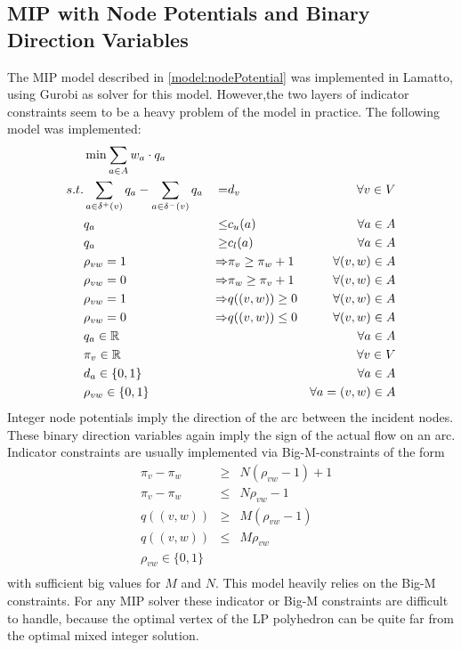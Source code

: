 \subsection{MIP with Node Potentials and Binary Direction Variables}
The MIP model described in \ref{model:nodePotential} was implemented in Lamatto, using Gurobi as solver for this 
model. However,the two layers of indicator constraints seem to be a heavy problem of the model in 
practice. The following model was implemented:
\begin{align*}
  &\min \sum_{a\in A} w_a\cdot q_a & \\
 s.t. & \sum_{a\in \delta^+(v)}q_a - \sum_{a\in\delta^- (v)}q_a &=& d_v\ &\forall v\in V \\
 & q_a &\le& c_u(a) & \forall a\in A\\
 & q_a &\ge& c_l(a) & \forall a\in A\\
 & \rho_{vw}=1 &\Rightarrow &\pi_v\ge\pi_w +1 & \forall (v,w)\in A\\
 & \rho_{vw}=0 &\Rightarrow &\pi_w\ge\pi_v +1& \forall (v,w)\in A\\
 & \rho_{vw}=1 &\Rightarrow &q((v,w))\ge 0& \forall (v,w)\in A\\
 & \rho_{vw}=0 &\Rightarrow &q((v,w))\le 0& \forall (v,w)\in A\\
 & q_a \in \mathbb{R} & & &\forall a\in A\\
 & \pi_v \in \mathbb{R} & & & \forall v\in V\\
 & d_a \in \{0,1\} & & &\forall a\in A\\
 & \rho_{vw} \in \{0,1\}&&& \forall a=(v,w)\in A\\
\end{align*}
Integer node potentials imply the direction of the arc between the incident nodes. These binary direction 
variables again imply the sign of the actual flow on an arc. Indicator constraints are usually implemented via 
Big-M-constraints of the form 
\begin{align*}
 &\pi_v-\pi_w &\ge & N(\rho_{vw}-1)+1\\
 &\pi_v-\pi_w&\le &N\rho_{vw}-1 \\
 &q((v,w))&\ge& M(\rho_{vw}-1)\\
 &q((v,w))&\le & M\rho_{vw}\\
 &\rho_{vw} \in \{0,1\}&&\\
\end{align*}
with sufficient big values for $M$ and $N$. This model heavily relies on the Big-M constraints.
For any MIP solver these indicator or Big-M constraints are difficult to handle, because the optimal vertex of the LP 
polyhedron can be quite far from the optimal mixed integer solution.\\

